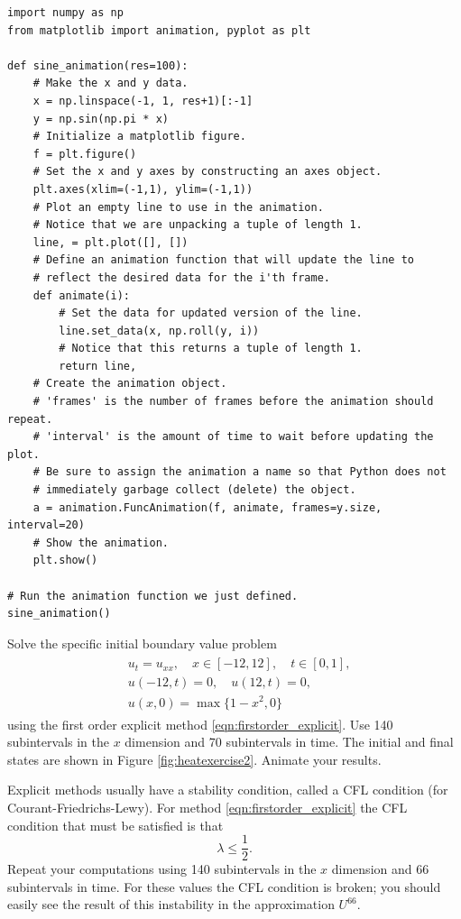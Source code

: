 \begin{lstlisting}
import numpy as np
from matplotlib import animation, pyplot as plt

def sine_animation(res=100):
    # Make the x and y data.
    x = np.linspace(-1, 1, res+1)[:-1]
    y = np.sin(np.pi * x)
    # Initialize a matplotlib figure.
    f = plt.figure()
    # Set the x and y axes by constructing an axes object.
    plt.axes(xlim=(-1,1), ylim=(-1,1))
    # Plot an empty line to use in the animation.
    # Notice that we are unpacking a tuple of length 1.
    line, = plt.plot([], [])
    # Define an animation function that will update the line to
    # reflect the desired data for the i'th frame.
    def animate(i):
        # Set the data for updated version of the line.
        line.set_data(x, np.roll(y, i))
        # Notice that this returns a tuple of length 1.
        return line,
    # Create the animation object.
    # 'frames' is the number of frames before the animation should repeat.
    # 'interval' is the amount of time to wait before updating the plot.
    # Be sure to assign the animation a name so that Python does not
    # immediately garbage collect (delete) the object.
    a = animation.FuncAnimation(f, animate, frames=y.size, interval=20)
    # Show the animation.
    plt.show()

# Run the animation function we just defined.
sine_animation()
\end{lstlisting}

\begin{problem}
\label{prob:heat_exercise2}
Solve the specific initial boundary value problem
\begin{align}
	\begin{split}
	&{ } u_t = u_{xx}, \quad x \in [-12,12],\quad t \in [0,1], \\
	&{ } u(-12,t) = 0,\quad u(12,t) = 0,\\
	&{ } u(x,0) = \max\{1 - x^2,0\}
	\end{split}
\end{align}
using the first order explicit method \ref{eqn:firstorder_explicit}.
Use 140 subintervals in the $x$ dimension and 70 subintervals in time.
The initial and final states are shown in Figure \ref{fig:heatexercise2}.
Animate your results.

Explicit methods usually have a stability condition, called a CFL condition (for Courant-Friedrichs-Lewy).
For method \ref{eqn:firstorder_explicit} the CFL condition that must be satisfied is that
\[\lambda \leq \frac{1}{2}.\]
Repeat your computations using 140 subintervals in the $x$ dimension and 66 subintervals in time.
For these values the CFL condition is broken; you should easily see the result of this instability in the approximation $U^{66}$.
\end{problem}


